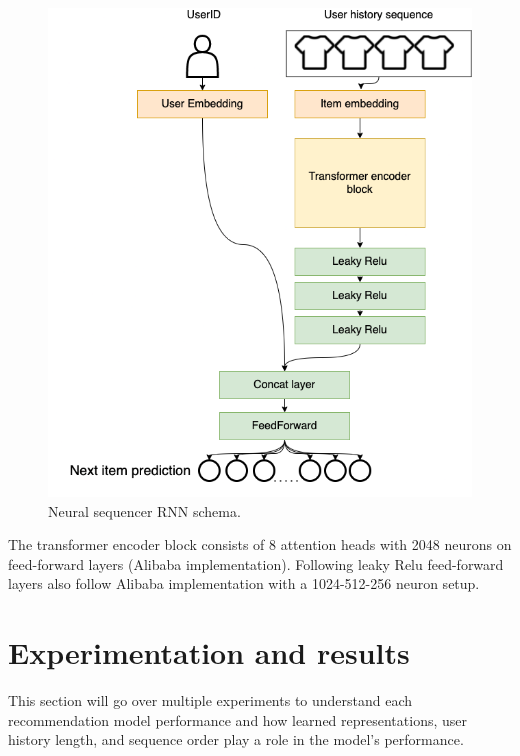\documentclass{tex_files/kththesis}
\begin{document}
\begin{figure}[H]
    \centering
    \includegraphics[scale=0.45]{images/models/Transformer.png}
    \caption{Neural sequencer RNN schema.}
\end{figure}

The transformer encoder block consists of 8 attention heads with 2048 neurons on feed-forward layers (Alibaba implementation). Following leaky Relu feed-forward layers also follow Alibaba implementation with a 1024-512-256 neuron setup.



\chapter{Experimentation and results}\label{results}
This section will go over multiple experiments to understand each recommendation model performance and how learned representations, user history length, and sequence order play a role in the model's performance.
\end{document}
